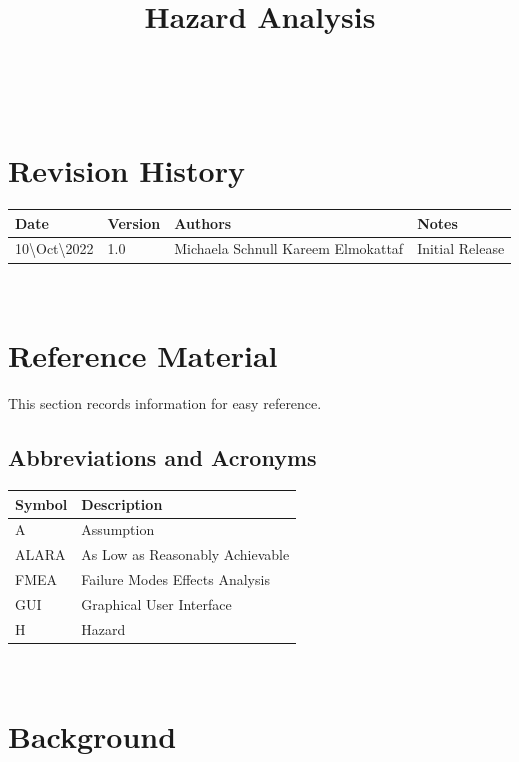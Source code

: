 \documentclass[12pt]{article}
\title{Hazard Analysis\\\progname}
\author{\authname}
\date{}
\begin{document}

\maketitle

\newpage

\tableofcontents
\listoffigures
\listoftables

~\newpage

\section*{Revision History}

\begin{tabularx}{1.0\textwidth}{p{3cm}p{2cm}p{4cm}X}
\toprule {\bf Date} & {\bf Version} & {\bf Authors} & {\bf Notes}\\
\midrule
10\textbackslash Oct\textbackslash 2022 & 1.0 & Michaela Schnull \newline Kareem Elmokattaf  & Initial Release\\
\bottomrule
\end{tabularx}

~\newpage

\section{Reference Material}

This section records information for easy reference.

\subsection{Abbreviations and Acronyms}

\renewcommand{\arraystretch}{1.2}
\begin{tabular}{l l} 
  \toprule		
  \textbf{Symbol} & \textbf{Description}\\
  \midrule 
  A & Assumption\\
  ALARA & As Low as Reasonably Achievable\\
  FMEA & Failure Modes Effects Analysis\\
  GUI & Graphical User Interface\\
  H & Hazard\\
  \bottomrule
\end{tabular}\\


\section{Background}
\end{document}
